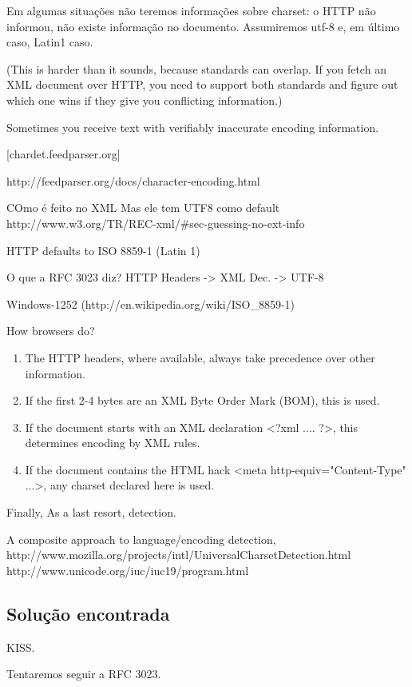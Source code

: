 Em algumas situações não teremos informações sobre charset: o HTTP não
informou, não existe informação no documento. Assumiremos utf-8 e, em
último caso, Latin1 caso.

    (This is harder than it sounds, because standards can overlap. If
    you fetch an XML document over HTTP, you need to support both
    standards and figure out which one wins if they give you conflicting
    information.)
    
    Sometimes you receive text with verifiably inaccurate encoding information.
    
    [chardet.feedparser.org]


http://feedparser.org/docs/character-encoding.html

    COmo é feito no XML
        Mas ele tem UTF8 como default
        http://www.w3.org/TR/REC-xml/#sec-guessing-no-ext-info

    HTTP defaults to ISO 8859-1 (Latin 1)

    O que a RFC 3023 diz? HTTP  Headers -> XML Dec. -> UTF-8


Windows-1252 (http://en.wikipedia.org/wiki/ISO_8859-1)

How browsers do?

\begin{enumerate}
\item The HTTP headers, where available, always take precedence over other information.
\item  If the first 2-4 bytes are an XML Byte Order Mark (BOM), this is used.
\item  If the document starts with an XML declaration <?xml .... ?>, this determines encoding by XML rules.
 \item If the document contains the HTML hack <meta http-equiv="Content-Type" ...>, any charset declared here is used.
\end{enumerate}

Finally, As a last resort, detection.

A composite approach to language/encoding detection,
    http://www.mozilla.org/projects/intl/UniversalCharsetDetection.html
    http://www.unicode.org/iuc/iuc19/program.html

\subsection{Solução encontrada}

KISS.

Tentaremos seguir a RFC 3023.
